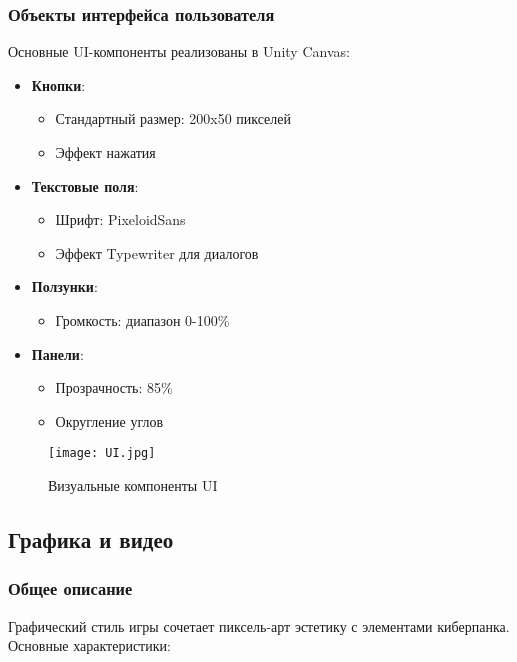 \documentclass{article}
\begin{document}
\subsubsection{Объекты интерфейса пользователя}
Основные UI-компоненты реализованы в Unity Canvas:

\begin{itemize}
\item \textbf{Кнопки}:
\begin{itemize}
\item Стандартный размер: 200x50 пикселей
\item Эффект нажатия
\end{itemize}

\item \textbf{Текстовые поля}:
\begin{itemize}
\item Шрифт: PixeloidSans 
\item Эффект Typewriter для диалогов
\end{itemize}

\item \textbf{Ползунки}:
\begin{itemize}
\item Громкость: диапазон 0-100\%
\end{itemize}

\item \textbf{Панели}:
\begin{itemize}
\item Прозрачность: 85\%
\item Округление углов
\end{itemize}
\end{itemize}

\begin{figure}[h]
\centering
\texttt{[image: UI.jpg]}
\caption{Визуальные компоненты UI}
\label{fig:ui_components}
\end{figure}

\subsection{Графика и видео}

\subsubsection{Общее описание}
Графический стиль игры сочетает пиксель-арт эстетику с элементами киберпанка. Основные характеристики:
\end{document}
